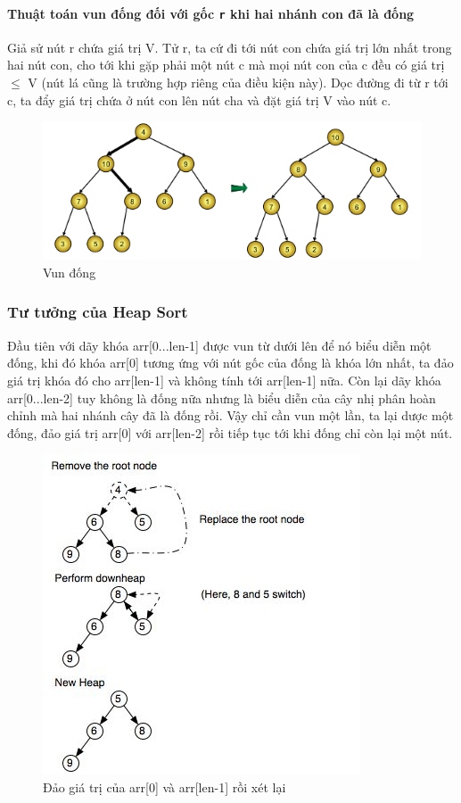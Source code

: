 \documentclass[a4paper]{article}
\begin{document}
\paragraph{Thuật toán vun đống đối với gốc \texttt{r} khi hai nhánh con đã là đống}
Giả sử nút r chứa giá trị V. Tử r, ta cứ đi tới nút con chứa giá trị lớn nhất trong hai nút con, cho tới khi gặp phải một nút c mà mọi nút con của c đều có giá trị $ \le $ V (nút lá cũng là trường hợp riêng của điều kiện này). Dọc đường đi từ r tới c, ta đẩy giá trị chứa ở nút con lên nút cha và đặt giá trị V vào nút c.
\pagebreak 
\begin{figure}[htp]
\centering
\includegraphics[scale=0.50]{img/buildheap.png}
\caption{Vun đống}
\label{}
\end{figure}

\subsubsection{Tư tưởng của Heap Sort}

Đầu tiên với dãy khóa arr[0...len-1] được vun từ dưới lên để nó biểu diễn một đống, khi đó khóa arr[0] tương ứng với nút gốc của đống là khóa lớn nhất, ta đảo giá trị khóa đó cho arr[len-1] và không tính tới arr[len-1] nữa. Còn lại dãy khóa arr[0...len-2] tuy không là đống nữa nhưng là biểu diễn của cây nhị phân hoàn chỉnh mà hai nhánh cây đã là đống rồi. Vậy chỉ cần vun một lần, ta lại dược một đống, đảo giá trị arr[0] với arr[len-2] rồi tiếp tục tới khi đống chỉ còn lại một nút.

\begin{figure}[htp]
\centering
\includegraphics[scale=0.5]{img/tachdong.jpg}
\caption{Đảo giá trị của arr[0] và arr[len-1] rồi xét lại}
\label{}
\end{figure}
\end{document}
